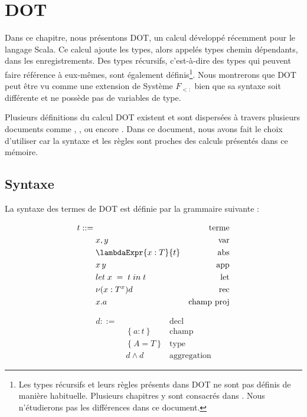 \chapter{DOT}

Dans ce chapitre, nous présentons DOT, un calcul développé récemment pour le
langage Scala. Ce calcul ajoute les types, alors
appelés types chemin dépendants, dans les enregistrements. Des types
récursifs, c'est-à-dire des types qui peuvent faire référence à eux-mêmes, sont
également définis\footnote{Les types récursifs et leurs règles présents dans DOT ne sont pas
  définis de manière habituelle. Plusieurs chapitres y sont consacrés dans
  \cite{tapl-recursive-types}. Nous n'étudierons pas les différences dans ce document.
}.
Nous montrerons que DOT peut être vu comme une
extension de Système $F_{<:}$ bien que sa syntaxe soit différente et ne possède
pas de variables de type.

Plusieurs définitions du calcul DOT existent et sont dispersées à travers
plusieurs documents comme \cite{nada-amin-thesis}, \cite{OOPSLA-DOT-2016},
\cite{POPL-2017-DOT} ou encore \cite{WF-DOT-2016}. Dans ce document, nous avons
fait le choix d'utiliser \cite{WF-DOT-2016} car la syntaxe et les règles sont
proches des calculs présentés dans ce mémoire.

\section{Syntaxe}

La syntaxe des termes de DOT est définie par la grammaire suivante :
\begin{minipage}{0.45\textwidth}
  \begin{align*}
    t ::= & \, & \text{terme} \\
          & \; x, y & \text{var} \\
          & \; \lambdaExpr{x : T}{t} & \text{abs} \\
          & \; x \, y & \text{app} \\
          & \; \localLetBinding{x}{t}{t} & \text{let} \\
          & \; \nu(x : T^{x})d & \text{rec} \\
          & \; x.a & \text{champ proj} \\
\end{align*}
\end{minipage}
\begin{minipage}{0.45\textwidth}
  \begin{align*}
    d ::= & \, & \text{decl} \\
          & \; \left\{ a : t \right\} & \text{champ} \\
          & \; \left\{ A = T \right\} & \text{type} \\
          & \; d \wedge d & \text{aggregation}
\end{align*}
\end{minipage}

